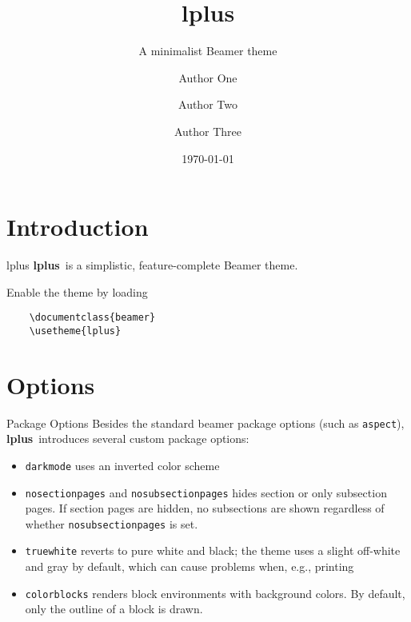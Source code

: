 \documentclass[aspectratio=169]{beamer}
\title[L+]{lplus}
\subtitle[Beamer Theme]{A minimalist Beamer theme}
\author[Author One et al.]{Author One \inst{1} \and Author Two \inst{1} \and Author Three \inst{2}}
\institute{\inst{1} First institute \and \inst{2} Second institute}
\date{\today}
\newcommand{\themename}{\textbf{lplus}~}
\begin{document}
\maketitle


\section{Introduction}

\begin{frame}[fragile]{lplus}
\themename  is a simplistic, feature-complete Beamer theme.

Enable the theme by loading
\begin{verbatim}
    \documentclass{beamer}
    \usetheme{lplus}
\end{verbatim}
\end{frame}

\section{Options}

\begin{frame}[fragile]{Package Options}
Besides the standard beamer package options (such as \alert{\texttt{aspect}}), \themename introduces several custom package options:
\begin{itemize}
\item \alert{\texttt{darkmode}} uses an inverted color scheme
\item \alert{\texttt{nosectionpages}} and \alert{\texttt{nosubsectionpages}} hides section or only subsection pages. If section pages are hidden, no subsections are shown regardless of whether \alert{\texttt{nosubsectionpages}} is set.
\item \alert{\texttt{truewhite}} reverts to pure white and black; the theme uses a slight off-white and gray by default, which can cause problems when, e.g., printing
\item \alert{\texttt{colorblocks}} renders block environments with background colors. By default, only the outline of a block is drawn.
\end{itemize}
\end{frame}
\end{document}
